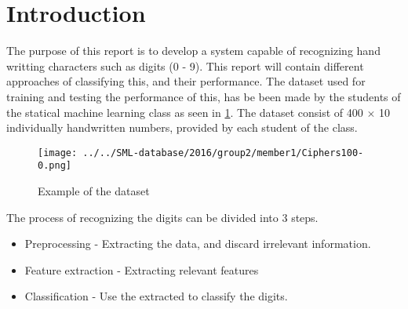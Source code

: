 \section{Introduction}
The purpose of this report is to develop a system capable of recognizing hand writting characters such as digits (0 - 9).  This report will contain different approaches of classifying this, and their performance.  The dataset used for training and testing the performance of this, has be been made by the students of the statical machine learning class  as seen in \ref{fig:data}. The dataset consist of 400 $\times$ 10 individually handwritten numbers,  provided by each  student of the class.  

\begin{figure}[H]
\centering
\texttt{[image: ../../SML-database/2016/group2/member1/Ciphers100-0.png]}
\caption{Example of the  dataset}
\label{fig:data}
\end{figure} 

The process of recognizing the digits can be divided into 3 steps. 
\begin{itemize}
\item Preprocessing - Extracting the data, and discard irrelevant information. 
\item Feature extraction - Extracting relevant features 
\item Classification - Use the extracted to classify the digits. 
\end{itemize}

